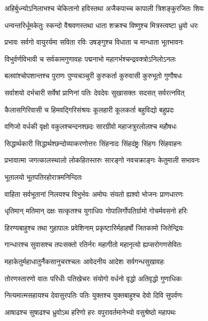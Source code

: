\twolineshloka
{अहिर्बुध्न्योऽनिलाभश्च चेकितानो हविस्तथा}%
{अजैकपाच्च कापाली त्रिशङ्कुरजितः शिवः}%

\twolineshloka
{धन्वन्तरिर्धूमकेतुः स्कन्दो वैश्रवणस्तथा}%
{धाता शक्रश्च विष्णुश्च मित्रस्त्वष्टा ध्रुवो धरः}%

\twolineshloka
{प्रभावः सर्वगो वायुरर्यमा सविता रविः}%
{उषङ्गुश्च विधाता च मान्धाता भूतभावनः}%

\twolineshloka
{विभुर्वर्णविभावी च सर्वकामगुणावहः}%
{पद्मनाभो महागर्भश्चन्द्रवक्त्रोऽनिलोऽनलः}%

\twolineshloka
{बलवांश्चोपशान्तश्च पुराणः पुण्यचञ्चुरी}%
{कुरुकर्ता कुरुवासी कुरुभूतो गुणौषधः}%

\twolineshloka
{सर्वाशयो दर्भचारी सर्वेषां प्राणिनां पतिः}%
{देवदेवः सुखासक्तः सदसत् सर्वरत्नवित्}%

\twolineshloka
{कैलासगिरिवासी च हिमवद्गिरिसंश्रयः}%
{कूलहारी कूलकर्ता बहुविद्यो बहुप्रदः}%

\twolineshloka
{वणिजो वर्धकी वृक्षो वकुलश्चन्दनश्छदः}%
{सारग्रीवो महाजत्रुरलोलश्च महौषधः}%

\twolineshloka
{सिद्धार्थकारी सिद्धार्थश्छन्दोव्याकरणोत्तरः}%
{सिंहनादः सिंहदंष्ट्रः सिंहगः सिंहवाहनः}%

\twolineshloka
{प्रभावात्मा जगत्कालस्थालो लोकहितस्तरुः}%
{सारङ्गो नवचक्राङ्गः केतुमाली सभावनः}%

\onelineshloka
{भूतालयो भूतपतिरहोरात्रमनिन्दितः}%

\twolineshloka
{वाहिता सर्वभूतानां निलयश्च विभुर्भवः}%
{अमोघः संयतो ह्यश्वो भोजनः प्राणधारणः}%

\twolineshloka
{धृतिमान् मतिमान् दक्षः सत्कृतश्च युगाधिपः}%
{गोपालिर्गोपतिर्ग्रामो गोचर्मवसनो हरिः}%

\twolineshloka
{हिरण्यबाहुश्च तथा गुहापालः प्रवेशिनाम्}%
{प्रकृष्टारिर्महाहर्षो जितकामो जितेन्द्रियः}%

\twolineshloka
{गान्धारश्च सुवासश्च तपःसक्तो रतिर्नरः}%
{महागीतो महानृत्यो ह्यप्सरोगणसेवितः}%

\twolineshloka
{महाकेतुर्महाधातुर्नैकसानुचरश्चलः}%
{आवेदनीय आदेशः सर्वगन्धसुखावहः}%

\twolineshloka
{तोरणस्तारणो वातः परिधीः पतिखेचरः}%
{संयोगो वर्धनो वृद्धो अतिवृद्धो गुणाधिकः}%

\twolineshloka
{नित्यमात्मसहायश्च देवासुरपतिः पतिः}%
{युक्तश्च युक्तबाहुश्च देवो दिवि सुपर्वणः}%

\twolineshloka
{आषाढश्च सुषाढश्च ध्रुवोऽथ हरिणो हरः}%
{वपुरावर्तमानेभ्यो वसुश्रेष्ठो महापथः}%

